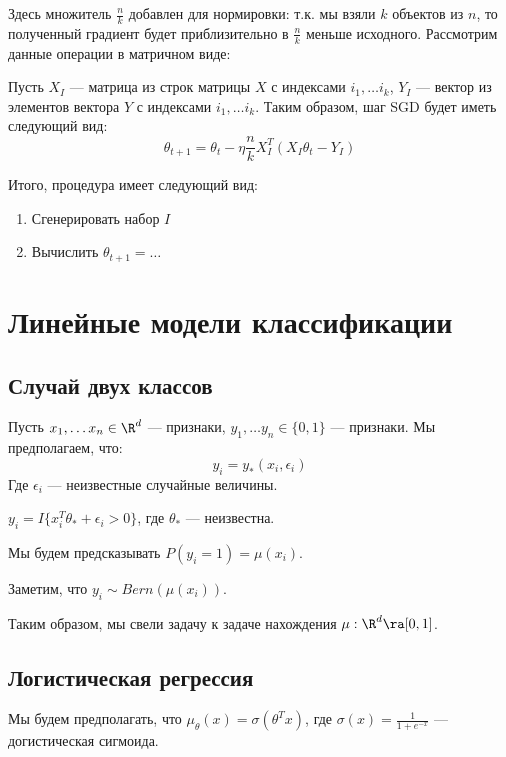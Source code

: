 Здесь множитель \(\frac{n}{k}\) добавлен для нормировки: т.к. мы взяли \(k\) объектов из \(n\), то полученный градиент будет приблизительно в \(\frac{n}{k}\) меньше исходного. Рассмотрим данные операции в матричном виде:

Пусть \(X_I\) --- матрица из строк матрицы \(X\) с индексами \(i_1, \dots i_k\), \(Y_I\) --- вектор из элементов вектора \(Y\) с индексами \(i_1, \dots i_k\). Таким образом, шаг SGD будет иметь следующий вид:
\[\theta_{t + 1} = \theta_t - \eta\frac{n}{k}X_I^T(X_I\theta_t - Y_I)\]

Итого, процедура имеет следующий вид:
\begin{enumerate}
    \item Сгенерировать набор \(I\)
    \item Вычислить \(\theta_{t + 1} = \dots\)
\end{enumerate}


\section{Линейные модели классификации}
\subsection{Случай двух классов}
Пусть \(x_1, \dots x_n \in \R^d\) --- признаки, \(y_1, \dots y_n \in \{0, 1\}\) --- признаки. Мы предполагаем, что:
\[y_i = y_*(x_i, \epsilon_i)\]
Где \(\epsilon_i\) --- неизвестные случайные величины.

\begin{example}
    \(y_i = I\{x_i^T\theta_* + \epsilon_i > 0\}\), где \(\theta_*\) --- неизвестна.
\end{example}

Мы будем предсказывать \(P(y_i = 1) = \mu(x_i)\).

\begin{note}
    Заметим, что \(y_i \sim Bern(\mu(x_i))\).
\end{note}

Таким образом, мы свели задачу к задаче нахождения \(\mu: \R^d \ra [0, 1]\).

\subsection{Логистическая регрессия}
Мы будем предполагать, что \(\mu_\theta(x) = \sigma(\theta^Tx)\), где \(\sigma(x) = \frac{1}{1 + e^{-x}}\) --- догистическая сигмоида. 

